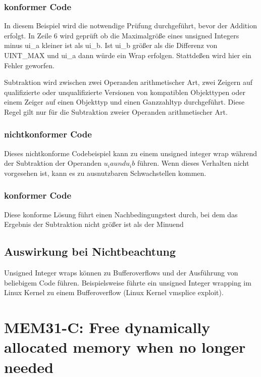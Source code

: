 \documentclass[12pt]{article}
\begin{document}
\subsubsection{konformer Code}

\newpage
In diesem Beispiel wird die notwendige Pr\"ufung durchgef\"uhrt, bevor der Addition erfolgt. In Zeile 6 wird gepr\"uft ob die Maximalgr\"o{\ss}e eines unsigned Integers minus ui\_a kleiner ist als ui\_b. Ist ui\_b gr\"o{\ss}er als die Differenz von UINT\_MAX und ui\_a dann w\"urde ein Wrap erfolgen. Stattde{\ss}en wird hier ein Fehler geworfen.

Subtraktion wird zwischen zwei Operanden arithmetischer Art, zwei Zeigern auf qualifizierte oder unqualifizierte Versionen von kompatiblen Objekttypen oder einem Zeiger auf einen Objekttyp und einen Ganzzahltyp durchgef\"uhrt. Diese Regel gilt nur f\"ur die Subtraktion zweier Operanden arithmetischer Art.
\subsubsection{nichtkonformer Code}
Dieses nichtkonforme Codebeispiel kann zu einem unsigned integer wrap w\"ahrend der Subtraktion der Operanden \( u_ia und u_ib\) f\"uhren. Wenn dieses Verhalten nicht vorgesehen ist, kann es zu ausnutzbaren Schwachstellen kommen.

\subsubsection{konformer Code}
Diese konforme L\"osung f\"uhrt einen Nachbedingungstest durch, bei dem das Ergebnis der Subtraktion nicht gr\"o{\ss}er ist als der Minuend

\subsection{Auswirkung bei Nichtbeachtung}
Unsigned Integer wraps k\"onnen zu Bufferoverflows und der Ausf\"uhrung von beliebigem  Code f\"uhren.
Beispielsweise f\"uhrte ein unsigned Integer wrapping im Linux Kernel zu einem Bufferoverflow (Linux Kernel vmsplice exploit).

\section{MEM31-C: Free dynamically allocated memory when no longer needed}
\end{document}

